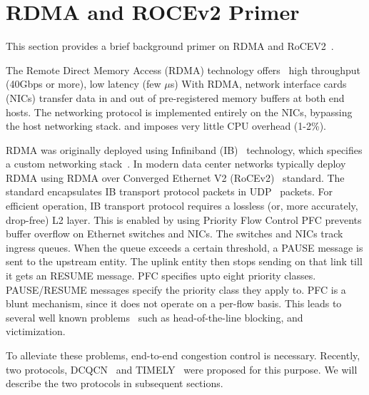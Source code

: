 \section{RDMA and ROCEv2 Primer}

This section provides a brief background primer on RDMA and
RoCEV2~\cite{rocev2}.

The Remote Direct Memory Access (RDMA) technology offers~\cite{dcqcn} high
throughput (40Gbps or more), low latency (few $\mu$s) With RDMA, network
interface cards (NICs) transfer data in and out of pre-registered memory buffers
at both end hosts. The networking protocol is implemented entirely on the NICs,
bypassing the host networking stack.  and imposes very little CPU overhead
(1-2\%). 

RDMA was originally deployed using Infiniband (IB)~\cite{ib-spec} technology,
which specifies a custom networking stack~\cite{ib-hw-spec}. In modern data
center networks typically deploy RDMA using RDMA over Converged Ethernet V2
(RoCEv2)~\cite{rocev2} standard. The standard encapsulates IB transport protocol
packets in UDP~\cite{rfc-udp} packets.  For efficient operation, IB transport
protocol requires a lossless (or, more accurately, drop-free) L2 layer. This is
enabled by using Priority Flow Control PFC prevents buffer overflow on Ethernet
switches and NICs. The switches and NICs track ingress queues. When the queue
exceeds a certain threshold, a PAUSE message is sent to the upstream entity. The
uplink entity then stops sending on that link till it gets an RESUME message.
PFC specifies upto eight priority classes. PAUSE/RESUME messages specify the
priority class they apply to. PFC is a blunt mechanism, since it does not
operate on a per-flow basis. This leads to several well known
problems~\cite{dcqcn,tcp-bolt} such as head-of-the-line blocking, and
victimization. 

To alleviate these problems, end-to-end congestion control is necessary.
Recently, two protocols, DCQCN~\cite{dcqcn} and TIMELY~\cite{timely} were
proposed for this purpose. We will describe the two protocols in subsequent
sections.

